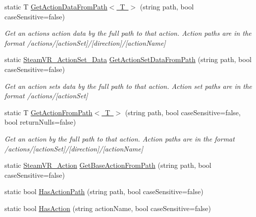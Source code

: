 \begin{DoxyCompactItemize}
static T \mbox{\hyperlink{class_valve_1_1_v_r_1_1_steam_v_r___input_a364b175a0b854190e86408807800cbe6}{Get\+Action\+Data\+From\+Path$<$ T $>$}} (string path, bool case\+Sensitive=false)
\begin{DoxyCompactList}\small\item\em Get an action\textquotesingle{}s action data by the full path to that action. Action paths are in the format /actions/\mbox{[}action\+Set\mbox{]}/\mbox{[}direction\mbox{]}/\mbox{[}action\+Name\mbox{]} \end{DoxyCompactList}\item 
static \mbox{\hyperlink{class_valve_1_1_v_r_1_1_steam_v_r___action_set___data}{Steam\+V\+R\+\_\+\+Action\+Set\+\_\+\+Data}} \mbox{\hyperlink{class_valve_1_1_v_r_1_1_steam_v_r___input_a85aeba67ee34a71320cf1ed2d6544ca0}{Get\+Action\+Set\+Data\+From\+Path}} (string path, bool case\+Sensitive=false)
\begin{DoxyCompactList}\small\item\em Get an action set\textquotesingle{}s data by the full path to that action. Action set paths are in the format /actions/\mbox{[}action\+Set\mbox{]} \end{DoxyCompactList}\item 
static T \mbox{\hyperlink{class_valve_1_1_v_r_1_1_steam_v_r___input_af951439eb937586e0f5975a8ee160af3}{Get\+Action\+From\+Path$<$ T $>$}} (string path, bool case\+Sensitive=false, bool return\+Nulls=false)
\begin{DoxyCompactList}\small\item\em Get an action by the full path to that action. Action paths are in the format /actions/\mbox{[}action\+Set\mbox{]}/\mbox{[}direction\mbox{]}/\mbox{[}action\+Name\mbox{]} \end{DoxyCompactList}\item 
static \mbox{\hyperlink{class_valve_1_1_v_r_1_1_steam_v_r___action}{Steam\+V\+R\+\_\+\+Action}} \mbox{\hyperlink{class_valve_1_1_v_r_1_1_steam_v_r___input_ab209d6c5f511a9a334f1138cb66aa2fb}{Get\+Base\+Action\+From\+Path}} (string path, bool case\+Sensitive=false)
\item 
static bool \mbox{\hyperlink{class_valve_1_1_v_r_1_1_steam_v_r___input_aa27da7ef81397ed3fb0e6ef12e13a2c7}{Has\+Action\+Path}} (string path, bool case\+Sensitive=false)
\item 
static bool \mbox{\hyperlink{class_valve_1_1_v_r_1_1_steam_v_r___input_a06b62e993650c4186256d2206702ffa7}{Has\+Action}} (string action\+Name, bool case\+Sensitive=false)
\item 

\end{DoxyCompactItemize}
